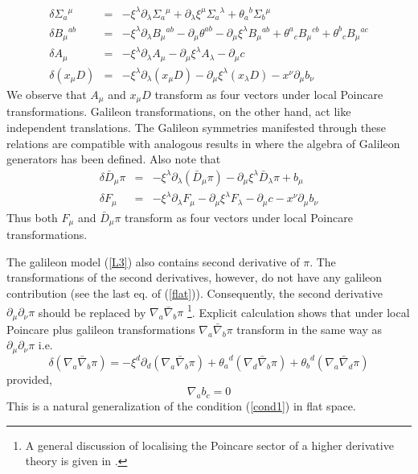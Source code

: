 \documentclass[12pt]{article}
\begin{document}
 \begin{eqnarray}
 \delta\Sigma_a{}^\mu &=& -\xi^\lambda\partial_\lambda
 \Sigma_a{}^\mu
+\partial_\lambda\xi^\mu
\Sigma_a{}^\lambda + \theta_a
{}^b\Sigma_b{}^\mu\nonumber\\
\delta B_\mu{}^{ab} &=& -\xi^\lambda\partial_\lambda
B_\mu{}^{ab}-\partial_\mu
\theta^{ab}
-\partial_\mu\xi^\lambda B_\mu{}^{ab} + \theta^a{}_c B_\mu{}^{cb} +\theta^b{}_c B_\mu{}^{ac} \nonumber\\
\delta A_\mu &=& -\xi^\lambda\partial_\lambda
A_\mu
-\partial_\mu\xi^\lambda A_\lambda -\partial_\mu c\nonumber\\
\delta \left(
x_\mu D\right) &=& -\xi^\lambda\partial_
\lambda\left(
x_\mu D\right) -\partial_\mu
\xi^\lambda \left(
x_\lambda D\right) -x^\nu\partial_\mu b_\nu \label{trans}
\end{eqnarray}
We observe that $A_{\mu}$ and $x_{\mu}D$ transform as four vectors under local Poincare transformations. Galileon transformations, on the other hand, act like independent translations. The Galileon symmetries manifested through these relations are compatible with analogous results in \cite{GHJT} where the algebra of Galileon generators has been defined.
Also note that 
\begin{eqnarray}
\delta{\bar{D}}_{\mu} \pi & = &-\xi^{\lambda}\partial_{\lambda}({\bar{D}}_{\mu} \pi)-\partial_{\mu}\xi^{\lambda}{\bar{D}}_{\lambda} \pi+b_{\mu}\nonumber\\
\delta F_\mu & = & -\xi^\lambda\partial_\lambda
F_\mu
-\partial_\mu\xi^\lambda F_\lambda -\partial_\mu c - x^\nu\partial_\mu b_\nu \label{trans1}
\end{eqnarray}
Thus both $F_\mu$ and ${\bar{D}}_\mu\pi$ transform as four vectors under local Poincare transformations.

The galileon model (\ref{L3}) also contains second derivative of $\pi$. The transformations of the second derivatives, however, do not have any galileon contribution (see the last eq. of (\ref{flat})). Consequently,
the second derivative $\partial_\mu\partial_\nu\pi$
should be replaced by 
$\nabla_a{\bar{\nabla}}_b\pi$ \footnote{A general discussion of localising the Poincare sector of a higher derivative theory is given in \cite{M1}.}. Explicit calculation shows that under local Poincare plus galileon transformations $\nabla_a{\bar{\nabla}}_b
\pi$ transform in the same way as $\partial_\mu\partial_\nu\pi$ i.e.
\begin{equation}
\delta(\nabla_a {\bar{\nabla}}_b\pi)=-\xi^d \partial_d(\nabla_a {\bar{\nabla}}_b\pi)+{\theta_a}^d (\nabla_d {\bar{\nabla}}_b\pi)+{\theta_b}^d (\nabla_a {\bar{\nabla}}_d\pi)
\end{equation}
provided,
\begin{equation}
\nabla_a b_c = 0\label{cond2}
\end{equation}
This is a natural generalization of the condition (\ref{cond1}) in flat space. 
\end{document}
